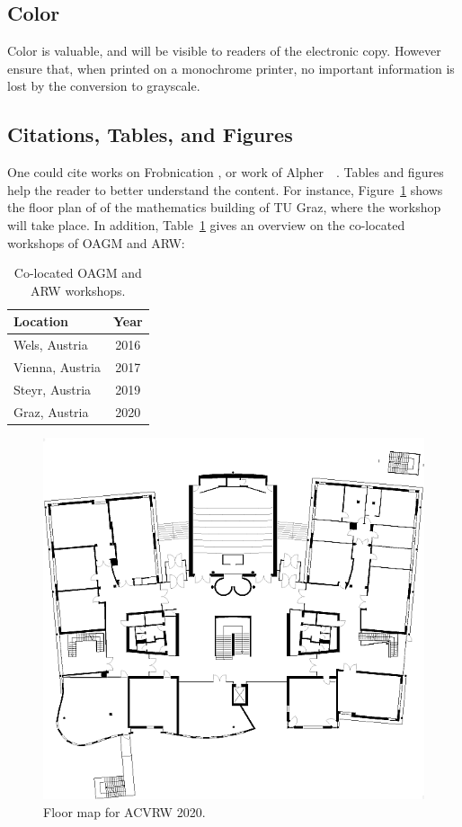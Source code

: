 \documentclass[11pt,twoside,twocolumn,a4paper]{article}
\begin{document}
\subsection{Color}

Color is valuable, and will be visible to readers of the electronic copy. 
However ensure that, when printed on a monochrome printer, no important 
information is lost by the conversion to grayscale. 


\subsection{Citations, Tables, and Figures}

One could cite works on Frobnication \cite{Alpher02, Alpher03}, or work of 
Alpher~\etal~\cite{Alpher04}. Tables and figures help the reader to better 
understand the content. For instance, Figure~\ref{fig:onecol} shows the floor 
plan of of the mathematics building of TU Graz, where the workshop will take 
place. In addition, Table~\ref{tab:participants} gives an overview on the 
co-located workshops of OAGM and ARW:  

\begin{table}
   \centering
   \begin{tabular}{|l|c|}
   \hline
    Location & Year \\
   \hline\hline
   Wels, Austria  & 2016 \\
   Vienna, Austria  & 2017 \\
   Steyr, Austria  & 2019 \\
   Graz, Austria  & 2020 \\
   \hline
   \end{tabular}
   \caption{Co-located OAGM and ARW workshops.}
   \label{tab:participants}
\end{table}


\begin{figure}
   \centering
   \includegraphics[width=0.65\columnwidth]{STEG.png}
   \caption{Floor map for ACVRW 2020.}
   \label{fig:onecol}
\end{figure}
\end{document}
